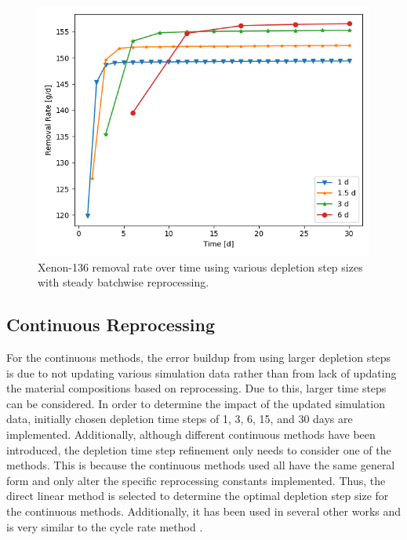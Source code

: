 {\begin{figure}[H]
  \centering
  \includegraphics[scale=0.7]{images/waste_Xe136_6d_sp_comp.png}
  \caption{Xenon-136 removal rate over time using various depletion step sizes with steady batchwise reprocessing.}
   \label{fig:steady-batch-xe136-repr}
\end{figure}

}

\subsection{Continuous Reprocessing}
\label{s:cont-meshing}


For the continuous methods, the error buildup from using larger depletion steps is due to not updating various simulation data rather than from lack of updating the material compositions based on reprocessing. Due to this, larger time steps can be considered. In order to determine the impact of the updated simulation data, initially chosen depletion time steps of 1, 3, 6, 15, and 30 days are implemented. Additionally, although different continuous methods have been introduced, the depletion time step refinement only needs to consider one of the methods. This is because the continuous methods used all have the same general form and only alter the specific reprocessing constants implemented. Thus, the direct linear method is selected to determine the optimal depletion step size for the continuous methods. Additionally, it has been used in several other works and is very similar to the cycle rate method \cite{xia_development_2019, nuttin_potential_2005, zhou_fuel_2018}.

